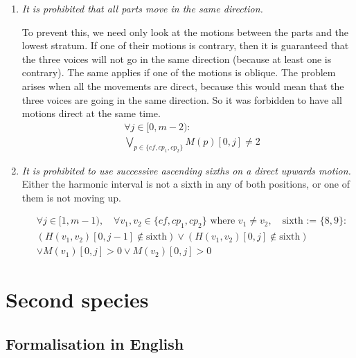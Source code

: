 \begin{enumerate}[wide, label=\bfseries 1.P\arabic*]


    \item\label{constraint:same-movement} \reddot \textit{It is prohibited that all parts move in the same direction.}

    To prevent this, we need only look at the motions between the parts and the lowest stratum. If one of their motions is contrary, then it is guaranteed that the three voices will not go in the same direction (because at least one is contrary). The same applies if one of the motions is oblique. The problem arises when all the movements are direct, because this would mean that the three voices are going in the same direction. So it was forbidden to have all motions direct at the same time.
    \begin{equation} \begin{aligned}
    &\forall j \in [0, m-2) \colon\\
    &\bigvee_{p \in \{cf, cp_1, cp_2\}}  M(p)[0, j] \neq 2
    \end{aligned} \end{equation}

    \item\label{constraint:ascending-sixths} \reddot \textit{It is prohibited to use successive ascending sixths on a direct upwards motion.}
    Either the harmonic interval is not a sixth in any of both positions, or one of them is not moving up.

    \begin{equation}
        \begin{aligned}
            & \forall j \in [1, m-1), \quad \forall v_1, v_2 \in \{cf, cp_1, cp_2\} \text{ where } v_1 \neq v_2, \quad \text{sixth := } \{8,9\} \colon \\
            & (H(v_1, v_2)[0, j-1] \notin \text{sixth}) \lor (H(v_1, v_2)[0, j] \notin \text{sixth}) \\
            & \lor M(v_1)[0, j] > 0 \lor M(v_2)[0, j] > 0
        \end{aligned}
        \end{equation}
\end{enumerate}


\section{Second species}
\subsection{Formalisation in English}\label{formalisation-en-2nd}
